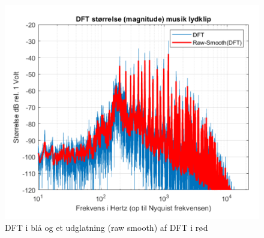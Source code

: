 \begin{figure}[H]
\centering
\includegraphics[width=\textwidth]{"figures/opgave6_musik_1.png"}
\caption{DFT i blå og et udglatning (raw smooth) af DFT i rød}
\label{fig:musik}
\end{figure}